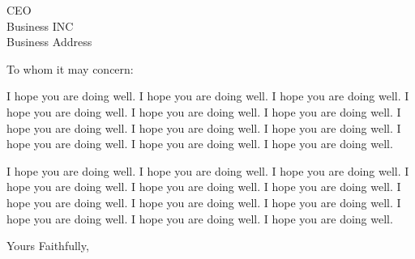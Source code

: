 \documentclass[12pt]{letter}
\begin{document}
	
\begin{letter}{CEO \\ Business INC \\ Business Address}

\opening{To whom it may concern:}

I hope you are doing well. I hope you are doing well. I hope you are doing well. I hope you are doing well. I hope you are doing well. I hope you are doing well. I hope you are doing well. I hope you are doing well. I hope you are doing well. I hope you are doing well. I hope you are doing well. I hope you are doing well. 

I hope you are doing well. I hope you are doing well. I hope you are doing well. I hope you are doing well. I hope you are doing well. I hope you are doing well. I hope you are doing well. I hope you are doing well. I hope you are doing well. I hope you are doing well. I hope you are doing well. I hope you are doing well. 

\closing{Yours Faithfully,}

\end{letter}
\end{document}
